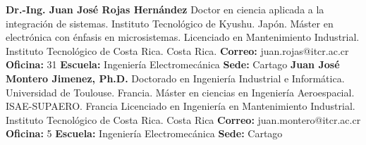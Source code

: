 \documentclass[letterpaper]{article}%
\newenvironment{textoMargen}
    {%
    \begin{list}{}{%
        \setlength{\leftmargin}{3.6cm}%
        \setlength{\rightmargin}{1.1cm}%
    }%
    \item[]%
  }
  {%
    \end{list}%
  }
\begin{document}
\vspace*{-4mm}\begin{textoMargen}\textbf{Dr.{-}Ing. Juan José Rojas Hernández} \vspace*{2mm} \newline Doctor en ciencia aplicada a la integración de sistemas. Instituto Tecnológico de Kyushu. Japón. \vspace*{1mm} \newline Máster en electrónica con énfasis en microsistemas. Licenciado en Mantenimiento Industrial. Instituto Tecnológico de Costa Rica. Costa Rica. \vspace*{1mm} \newline \textbf{Correo:} juan.rojas@itcr.ac.cr\textbf{  Oficina:} 31 \vspace*{1mm} \newline \textbf{Escuela:} Ingeniería Electromecánica\textbf{  Sede:} Cartago \vspace*{4mm} \newline \textbf{Juan José Montero Jimenez, Ph.D.} \vspace*{2mm} \newline Doctorado en Ingeniería Industrial e Informática. Universidad de Toulouse. Francia. \vspace*{1mm} \newline Máster en ciencias en Ingeniería Aeroespacial. ISAE-SUPAERO. Francia \vspace*{1mm} \newline Licenciado en Ingeniería en Mantenimiento Industrial. Instituto Tecnológico de Costa Rica. Costa Rica \vspace*{1mm} \newline \textbf{Correo:} juan.montero@itcr.ac.cr\textbf{  Oficina:} 5 \vspace*{1mm} \newline \textbf{Escuela:} Ingeniería Electromecánica\textbf{  Sede:} Cartago \vspace*{4mm} \newline \end{textoMargen}%
\end{document}
